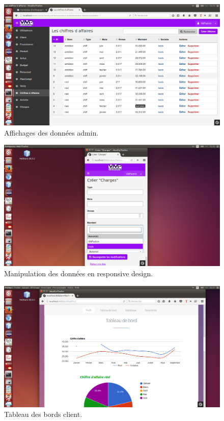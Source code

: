\documentclass[12pt]{article}
\begin{document}
\begin{figure}[htp]
  \centering
  \includegraphics[width=12cm]{t8.png}
  \caption{Affichages des données admin.}
  \label{fig:une-autre-image}
\end{figure}

\begin{figure}[htp]
  \centering
  \includegraphics[width=12cm]{t10.png}
  \caption{Manipulation des données en responsive design.}
  \label{fig:une-autre-image}
\end{figure}

\begin{figure}[htp]
  \centering
  \includegraphics[width=12cm]{t11.png}
  \caption{Tableau des bords client.}
  \label{fig:une-autre-image}
\end{figure}
\end{document}
